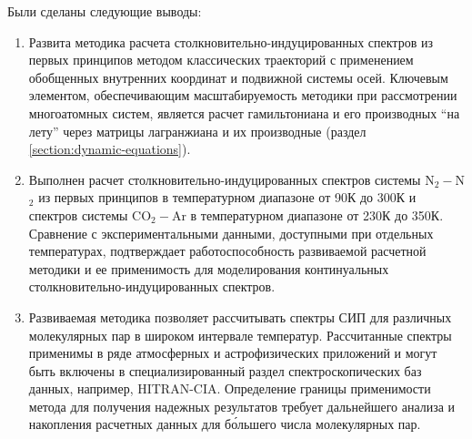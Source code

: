 Были сделаны следующие выводы:
\begin{enumerate}
    \item Развита методика расчета столкновительно-индуцированных спектров из первых принципов методом классических траекторий с применением обобщенных внутренних координат и подвижной системы осей. Ключевым элементом, обеспечивающим масштабируемость методики при рассмотрении многоатомных систем, является расчет гамильтониана и его производных \enquote{на лету} через матрицы лагранжиана и их производные (раздел \ref{section:dynamic-equations}).
    \item Выполнен расчет столкновительно-индуцированных спектров системы N$_2-$N$_2$ из первых принципов в температурном диапазоне от 90К до 300К  и спектров системы CO$_2-$Ar в температурном диапазоне от 230К до 350К. Сравнение с экспериментальными данными, доступными при отдельных температурах, подтверждает работоспособность развиваемой расчетной методики и ее применимость для моделирования континуальных столкновительно-индуцированных спектров.
    \item Развиваемая методика позволяет рассчитывать спектры СИП для различных молекулярных пар в широком интервале температур. Рассчитанные спектры применимы в  ряде атмосферных и астрофизических приложений и могут быть включены в специализированный раздел спектроскопических баз данных, например, HITRAN-CIA. Определение границы применимости метода для получения надежных результатов требует дальнейшего анализа и накопления расчетных данных для б\'{о}льшего числа молекулярных пар.  
\end{enumerate}

\iffalse
Из проделанной работы были сделаны следующие выводы
\begin{enumerate}
    \item Построена методика расчета столкновительно-индуцированных спектров методом классических траекторий. При помощи развитой методики проведены расчеты спектров систем He$-$Ar, CO$_2-$Ar и N$_2-$N$_2$, которые находятся в хорошем согласии с экспериментальными и теоретическими данными.
\end{enumerate}
\fi
